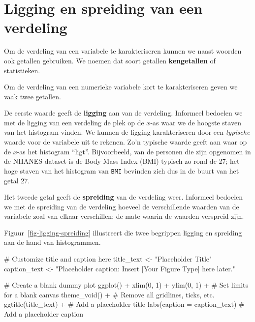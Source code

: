 \documentclass[
  a4paper,
]{scrbook}
\newenvironment{Shaded}{\begin{snugshade}}{\end{snugshade}}
\newcommand{\AttributeTok}[1]{\textcolor[rgb]{0.40,0.45,0.13}{#1}}
\newcommand{\CommentTok}[1]{\textcolor[rgb]{0.37,0.37,0.37}{#1}}
\newcommand{\DecValTok}[1]{\textcolor[rgb]{0.68,0.00,0.00}{#1}}
\newcommand{\FunctionTok}[1]{\textcolor[rgb]{0.28,0.35,0.67}{#1}}
\newcommand{\NormalTok}[1]{\textcolor[rgb]{0.00,0.23,0.31}{#1}}
\newcommand{\OtherTok}[1]{\textcolor[rgb]{0.00,0.23,0.31}{#1}}
\newcommand{\SpecialCharTok}[1]{\textcolor[rgb]{0.37,0.37,0.37}{#1}}
\newcommand{\StringTok}[1]{\textcolor[rgb]{0.13,0.47,0.30}{#1}}
\theoremstyle{definition}
\theoremstyle{definition}
\theoremstyle{remark}
\begin{document}
\section{Ligging en spreiding van een
verdeling}\label{ligging-en-spreiding-van-een-verdeling}

Om de verdeling van een variabele te karakteriseren kunnen we naast
woorden ook getallen gebruiken. We noemen dat soort getallen
\textbf{kengetallen} of statistieken.

Om de verdeling van een numerieke variabele kort te karakteriseren geven
we vaak twee getallen.

De eerste waarde geeft de \textbf{ligging} aan van de verdeling.
Informeel bedoelen we met de ligging van een verdeling de plek op de
\(x\)-as waar we de hoogste staven van het histogram vinden. We kunnen
de ligging karakteriseren door een \emph{typische} waarde voor de
variabele uit te rekenen. Zo'n typische waarde geeft aan waar op de
\(x\)-as het histogram ``ligt''. Bijvoorbeeld, van de personen die zijn
opgenomen in de NHANES dataset is de Body-Mass Index (BMI) typisch zo
rond de 27; het hoge staven van het histogram van \texttt{BMI} bevinden
zich dus in de buurt van het getal 27.

Het tweede getal geeft de \textbf{spreiding} van de verdeling weer.
Informeel bedoelen we met de spreiding van de verdeling hoeveel de
verschillende waarden van de variabele zoal van elkaar verschillen; de
mate waarin de waarden verspreid zijn.

Figuur~\ref{fig-ligging-spreiding} illustreert die twee begrippen
ligging en spreiding aan de hand van histogrammen.

\begin{Shaded}
\begin{Highlighting}[]
\CommentTok{\# Customize title and caption here}
\NormalTok{title\_text }\OtherTok{\textless{}{-}} \StringTok{"Placeholder Title"}
\NormalTok{caption\_text }\OtherTok{\textless{}{-}} \StringTok{"Placeholder caption: Insert [Your Figure Type] here later."}

\CommentTok{\# Create a blank dummy plot}
\FunctionTok{ggplot}\NormalTok{() }\SpecialCharTok{+}
  \FunctionTok{xlim}\NormalTok{(}\DecValTok{0}\NormalTok{, }\DecValTok{1}\NormalTok{) }\SpecialCharTok{+} \FunctionTok{ylim}\NormalTok{(}\DecValTok{0}\NormalTok{, }\DecValTok{1}\NormalTok{) }\SpecialCharTok{+}  \CommentTok{\# Set limits for a blank canvas}
  \FunctionTok{theme\_void}\NormalTok{() }\SpecialCharTok{+}             \CommentTok{\# Remove all gridlines, ticks, etc.}
  \FunctionTok{ggtitle}\NormalTok{(title\_text) }\SpecialCharTok{+}       \CommentTok{\# Add a placeholder title}
  \FunctionTok{labs}\NormalTok{(}\AttributeTok{caption =}\NormalTok{ caption\_text) }\CommentTok{\# Add a placeholder caption}
\end{Highlighting}
\end{Shaded}
\end{document}
